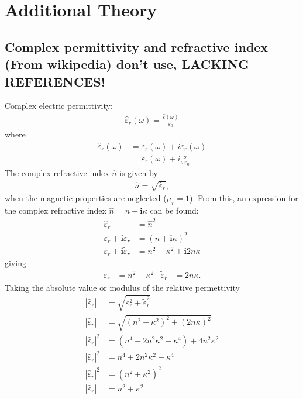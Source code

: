 \section{Additional Theory}

\subsection{Complex permittivity and refractive index (From wikipedia) don't use, LACKING REFERENCES!}
Complex electric permittivity:
\begin{align}
   \hat{\varepsilon}_r(\omega) = \frac{\hat{\varepsilon} (\omega)}{\varepsilon_0}
\end{align}
where 
\begin{align}
   \hat{\varepsilon}_r(\omega) &= \varepsilon_r (\omega) + i\tilde{\varepsilon}_r (\omega) \\
                               &= \varepsilon_r (\omega) + i\frac{\sigma}{\omega\varepsilon_0} 
\end{align}
The complex refractive index $\hat{n}$ is given by 
\begin{align}
   \hat{n} = \sqrt{\hat{\varepsilon}_r},
\end{align}
when the magnetic properties are neglected ($\mu_r = 1$). 
From this, an expression for the complex refractive index $\hat{n} = n - \boldsymbol{i}\kappa$ can be found:
\begin{align}
   \hat{\varepsilon}_r &= \hat{n}^2 \\
   \varepsilon_r + \boldsymbol{i}\tilde{\varepsilon}_r &= (n + \boldsymbol{i} \kappa)^2 \\
   \varepsilon_r + \boldsymbol{i}\tilde{\varepsilon}_r &= n^2 - \kappa^2 + \boldsymbol{i}2n\kappa
\end{align}
giving
\begin{align}
   \varepsilon_r &= n^2 - \kappa^2     &\tilde{\varepsilon}_r  &= 2n\kappa.
\end{align}
Taking the absolute value or modulus of the relative permettivity
\begin{align}
   |\hat{\varepsilon}_r| &= \sqrt{ \varepsilon_r^2 + \tilde{\varepsilon}_r^2} \\
   |\hat{\varepsilon}_r| &= \sqrt{ (n^2 - \kappa^2)^2 + (2n\kappa)^2} \\
   |\hat{\varepsilon}_r|^2 &= (n^4 - 2n^2\kappa^2 + \kappa^4) + 4n^2\kappa^2 \\
   |\hat{\varepsilon}_r|^2 &= n^4 + 2n^2\kappa^2 + \kappa^4 \\
   |\hat{\varepsilon}_r|^2 &= (n^2 + \kappa^2)^2 \\
   |\hat{\varepsilon}_r| &= n^2 + \kappa^2 
\end{align}
